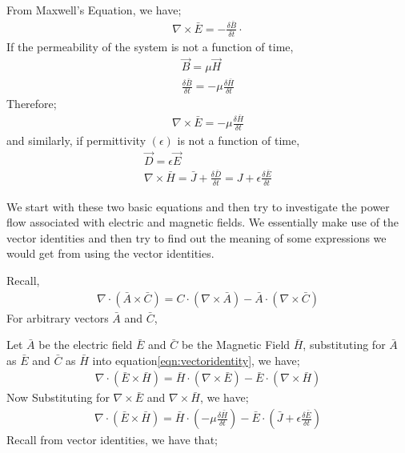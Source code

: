 From Maxwell's Equation, we have;
\begin{align}
\nabla\times\bar{E}=-\frac{\delta\bar{B}}{\delta t} \cdot 
\end{align} 
If the permeability of the system is not a function of time,
\begin{align}
\vec{B}=\mu \vec{H}\\
\frac{\delta\bar{B}}{\delta t}= -\mu\frac{\delta\bar{H}}{\delta t}
\end{align}
Therefore;
\begin{align}
\nabla\times\bar{E} = -\mu \frac{\delta\bar{H}}{\delta t} 
\end{align} 
and similarly, if permittivity  $(\epsilon) $ is not a function of time,
\begin{align}
\vec{D} = \epsilon \vec{E}\\
\nabla\times\bar{H} =\bar{J} + \frac{\delta\bar{D}}{\delta t}  =  J + \epsilon\frac{\delta\bar{E}}{\delta t} 
\end{align}

We start with these two basic equations and then try to investigate the power flow associated with electric and magnetic fields. We essentially make use of the vector identities and then try to find out the meaning of some expressions we would get from using the vector identities.

Recall,
\begin{align}
\nabla \cdot ( \bar{A}\times\bar{C} ) = C \cdot (\nabla\times\bar{A}) - \bar{A}\cdot(\nabla\times\bar{C})
\label{eqn:vectoridentity} 
\end{align} 
For arbitrary vectors $\bar{A}$ and $\bar{C}$,

Let $\bar{A}$ be the electric field $\bar{E}$ and $ \bar{C} $ be the Magnetic Field $\bar{H}$, substituting for $\bar{A}$ as $\bar{E}$ and $\bar{C}$ as $\bar{H}$ into equation\ref{eqn:vectoridentity}, we have;
\begin{align}
\nabla\cdot(\bar{E}\times\bar{H})= \bar{H}\cdot(\nabla\times\bar{E})-\bar{E}\cdot(\nabla\times\bar{H})
\end{align} 
Now Substituting for $\nabla\times\bar{E}$ and $\nabla\times\bar{H}$, we have;
\begin{align}
\nabla\cdot(\bar{E}\times\bar{H})=
\bar{H}\cdot(-\mu\frac{\delta\bar{H}}{\delta t}) - \bar{E}\cdot(\bar{J}+\epsilon\frac{\delta\bar{E}}{\delta t})
\label{eqn:enhpowflow}
\end{align}
Recall from vector identities, we  have that;

